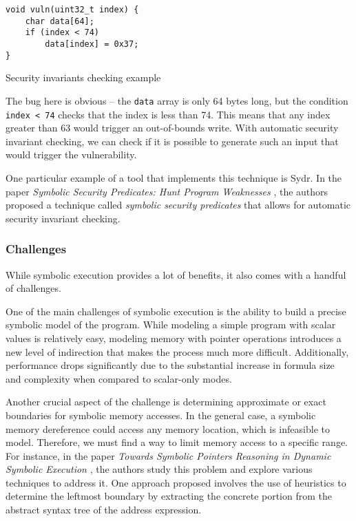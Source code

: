 \begin{listing}[htp]
	\centering
	\begin{minipage}{.4\linewidth}
		\begin{verbatim}
void vuln(uint32_t index) {
	char data[64];
	if (index < 74)
		data[index] = 0x37;
}
		\end{verbatim}
	\end{minipage}
	\caption{Security invariants checking example}
	\label{lst:example6}
\end{listing}

The bug here is obvious -- the \texttt{data} array is only 64 bytes long, but the condition \texttt{index < 74} checks that the index is less than 74. This means that any index greater than 63 would trigger an out-of-bounds write. With automatic security invariant checking, we can check if it is possible to generate such an input that would trigger the vulnerability.

One particular example of a tool that implements this technique is Sydr. In the paper \textit{Symbolic Security Predicates: Hunt Program Weaknesses} \cite{symbolic-security-predicates}, the authors proposed a technique called \textit{symbolic security predicates} that allows for automatic security invariant checking.

\subsubsection{Challenges} \label{symbolic_execution:challenges}

While symbolic execution provides a lot of benefits, it also comes with a handful of challenges.


One of the main challenges of symbolic execution is the ability to build a precise symbolic model of the program. While modeling a simple program with scalar values is relatively easy, modeling memory with pointer operations introduces a new level of indirection that makes the process much more difficult. Additionally, performance drops significantly due to the substantial increase in formula size and complexity when compared to scalar-only modes.

Another crucial aspect of the challenge is determining approximate or exact boundaries for symbolic memory accesses. In the general case, a symbolic memory dereference could access any memory location, which is infeasible to model. Therefore, we must find a way to limit memory access to a specific range. For instance, in the paper \textit{Towards Symbolic Pointers Reasoning in Dynamic Symbolic Execution} \cite{symbolic-pointers-reasoning}, the authors study this problem and explore various techniques to address it. One approach proposed involves the use of heuristics to determine the leftmost boundary by extracting the concrete portion from the abstract syntax tree of the address expression.

